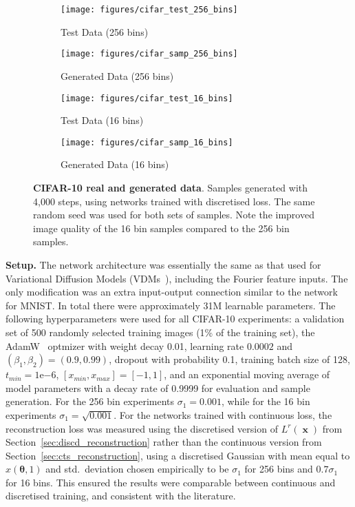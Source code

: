 \documentclass[11pt,table]{article}
\DeclareMathOperator{\x}{\mathbf{x}}
\renewcommand{\vec}[1]{\boldsymbol{#1}}
\newcommand{\pars}{\theta}
\newcommand{\parsn}{\vec{\pars}}
\newcommand{\0}[1]{\constvec{0}{#1}}
\newcommand{\1}[1]{\constvec{1}{#1}}
\begin{document}
\begin{figure}[t!]
\centering
\begin{subfigure}{.5\textwidth}
  \centering
  \texttt{[image: figures/cifar\_test\_256\_bins]}
  \caption{Test Data (256 bins)}
\end{subfigure}\begin{subfigure}{.5\textwidth}
  \centering
  \texttt{[image: figures/cifar\_samp\_256\_bins]}
  \caption{Generated Data (256 bins)}
\end{subfigure}
\par\bigskip
\begin{subfigure}{.5\textwidth}
  \centering
  \texttt{[image: figures/cifar\_test\_16\_bins]}
  \caption{Test Data (16 bins)}
\end{subfigure}\begin{subfigure}{.5\textwidth}
  \centering 
  \texttt{[image: figures/cifar\_samp\_16\_bins]}
  \caption{Generated Data (16 bins)}
\end{subfigure}
\caption{\textbf{CIFAR-10 real and generated data}. Samples generated with 4,000 steps, using networks trained with discretised loss. The same random seed was used for both sets of samples. Note the improved image quality of the 16 bin samples compared to the 256 bin samples.}
\label{fig:cifar_samples}
\end{figure}

\noindent\textbf{Setup.}\quad 
The network architecture was essentially the same as that used for Variational Diffusion Models (VDMs~\citep{kingma2021variational}), including the Fourier feature inputs.
The only modification was an extra input-output connection similar to the network for MNIST.
In total there were approximately 31M learnable parameters.
The following hyperparameters were used for all CIFAR-10 experiments:
a validation set of 500 randomly selected training images (1\% of the training set),
the  AdamW~\citep{loshchilov2017decoupled} optmizer with weight decay 0.01, learning rate $0.0002$ and $(\beta_1,\beta_2) = (0.9,0.99)$,
dropout with probability 0.1,
training batch size of 128,
$t_{min} = 1\mathrm{e}{-6}$,
$[x_{min}, x_{max}] = [-1, 1]$, and
an exponential moving average of model parameters with a decay rate of 0.9999 for evaluation and sample generation.
For the 256 bin experiments $\sigma_1 = 0.001$, while for the 16 bin experiments $\sigma_1 = \sqrt{0.001}$.
For the networks trained with continuous loss, the reconstruction loss was measured using the discretised version of $L^r(\x)$ from Section~\ref{sec:discd_reconstruction} rather than the continuous version from Section~\ref{sec:cts_reconstruction}, using a discretised Gaussian with mean equal to $\hat{x}(\parsn, 1)$ and std.\ deviation chosen empirically to be $\sigma_1$ for 256 bins and $0.7 \sigma_1$ for 16 bins.
This ensured the results were comparable between continuous and discretised training, and consistent with the literature.
\\
\end{document}
